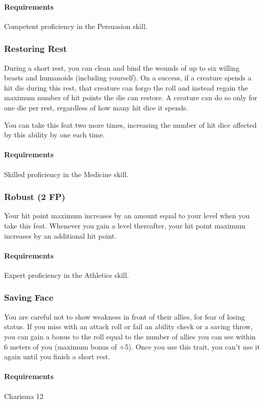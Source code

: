     \paragraph{Requirements} Competent proficiency in the Persuasion skill.
\subsubsection{Restoring Rest} \label{feat::restoringrest}
    During a short rest, you can clean and bind the wounds of up to six willing beasts and humanoids (including yourself).
    On a success, if a creature spends a hit die during this rest, that creature can forgo the roll and instead regain the maximum number of hit points the die can restore.
    A creature can do so only for one die per rest, regardless of how many hit dice it spends.

    You can take this feat two more times, increasing the number of hit dice affected by this ability by one each time.
    \paragraph{Requirements} Skilled proficiency in the Medicine skill.
\subsubsection{Robust (2 FP)} \label{feat::robust}
    Your hit point maximum increases by an amount equal to your level when you take this feat.
    Whenever you gain a level thereafter, your hit point maximum increases by an additional hit point.
    \paragraph{Requirements} Expert proficiency in the Athletics skill.
\subsubsection{Saving Face} \label{feat::savingface}
    You are careful not to show weakness in front of their allies, for fear of losing status.
    If you miss with an attack roll or fail an ability check or a saving throw, you can gain a bonus to the roll equal to the number of allies you can see within 6 meters of you (maximum bonus of +5).
    Once you use this trait, you can't use it again until you finish a short rest.
    \paragraph{Requirements} Charisma 12
